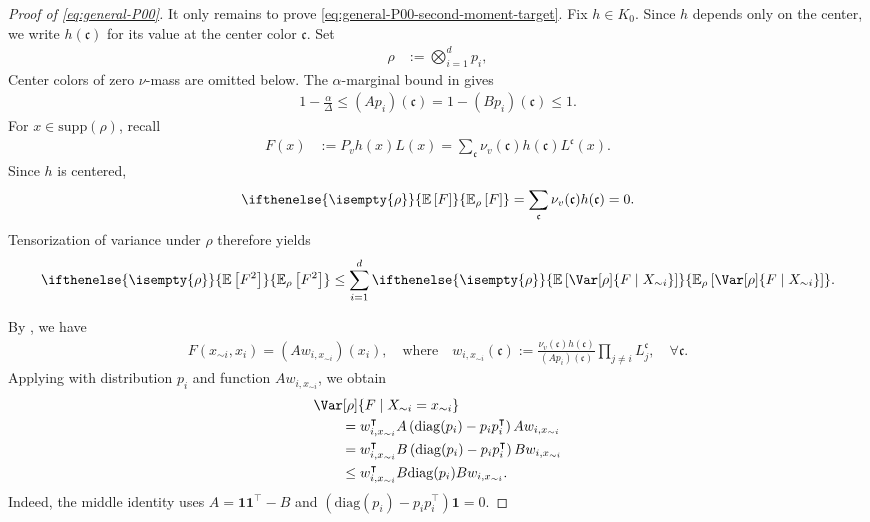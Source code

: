 \documentclass[a4paper,12pt]{article}
\theoremstyle{plain}
\theoremstyle{definition}
\def\*#1{\mathbf{#1}} %
\def\-#1{\mathrm{#1}} %
\def\!#1{\mathfrak{#1}} %
\def\*#1{\boldsymbol{#1}} %
\def\-#1{\mathrm{#1}} %
\def\!#1{\mathfrak{#1}} %
\def\oE{\mathbb{E}}
\newcommand{\E}[2][]{ \ifthenelse{\isempty{#1}}
  {\oE\left[#2\right]}
  {\oE_{#1}\left[#2\right]} }
\newcommand{\tuple}[1]{\left(#1\right)}
\newcommand{\tp}{\tuple}
\begin{document}
\begin{proof}[Proof of \eqref{eq:general-P00}]
It only remains to prove \eqref{eq:general-P00-second-moment-target}.
%
Fix $h\in K_0$.  Since $h$ depends only on the center, we write
$h(\!c)$ for its value at the center color $\!c$.  Set
\begin{align*}
  \rho&:=\bigotimes_{i=1}^d p_i,
\end{align*}
Center colors of zero $\nu$-mass are omitted below.  The
$\alpha$-marginal bound in
 gives
\begin{align}
  1-\frac{\alpha}{\Delta}
  \leq
  (Ap_i)(\!c)
  =1-(Bp_i)(\!c)
  \leq1.
  \label{eq:general-P00-z-bound}
\end{align}
For $x\in\-{supp}(\rho)$, recall
\begin{align*}
  F(x)
  &:={}
  P_vh(x)L(x)
  =\sum_{\!c}\nu_v(\!c)h(\!c)L^{\!c}(x).
\end{align*}
Since $h$ is centered,
\begin{align*}
  \E[\rho]{F}
  =\sum_{\!c}\nu_v(\!c)h(\!c)
  =0.
\end{align*}
Tensorization of variance under $\rho$ therefore yields
\begin{align}
  \E[\rho]{F^2}
  \leq
  \sum_{i=1}^d
  \E[\rho]{
    \Var[\rho]{F\mid X_{\sim i}}
  }.
  \label{eq:general-P00-tensorization}
\end{align}

By , we have
\begin{align*}
  F(x_{\sim i}, x_i) =(Aw_{i,x_{\sim i}})(x_i), \quad \text{where} \quad
  w_{i,x_{\sim i}}(\!c)
  :=
  \frac{\nu_v(\!c)h(\!c)}{(Ap_i)(\!c)}
  \prod_{j\ne i}L^{\!c}_j,\quad \forall \!c.
\end{align*}
Applying
 with distribution $p_i$ and function
$Aw_{i,x_{\sim i}}$, we obtain
\begin{align}
  \nonumber
  &\Var[\rho]{F\mid X_{\sim i}=x_{\sim i}}
  \\
  \nonumber
  &\qquad=
  w_{i,x_{\sim i}}^\intercal
  A\tp{\-{diag}(p_i)-p_ip_i^\intercal}A
  w_{i,x_{\sim i}}
  \\
  \nonumber
  &\qquad=
  w_{i,x_{\sim i}}^\intercal
  B\tp{\-{diag}(p_i)-p_ip_i^\intercal}B
  w_{i,x_{\sim i}}
  \\
  &\qquad\leq
  w_{i,x_{\sim i}}^\intercal
  B\-{diag}(p_i)B
  w_{i,x_{\sim i}}.
  \label{eq:general-P00-tensorization-B}  
\end{align}
Indeed, the middle identity uses
$A=\*1\*1^\intercal-B$ and
$\tp{\-{diag}(p_i)-p_ip_i^\intercal}\*1=0$.


\end{proof}
\end{document}
